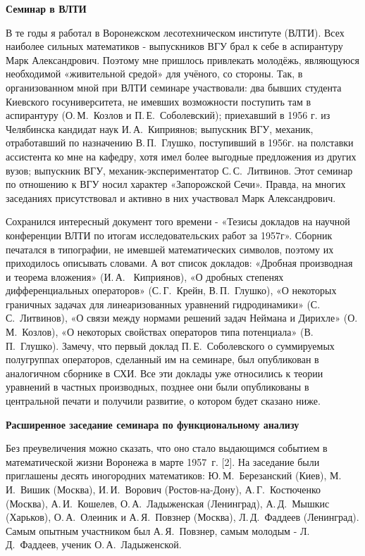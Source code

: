 {\bf Семинар в ВЛТИ}

В те годы я работал в Воронежском лесотехническом институте (ВЛТИ).
Всех наиболее сильных математиков - выпускников ВГУ брал к себе в аспирантуру Марк Александрович.
Поэтому мне пришлось привлекать молодёжь, являющуюся необходимой «живительной средой» для учёного, со стороны.
Так, в организованном мной при ВЛТИ семинаре участвовали:
два бывших студента Киевского госуниверситета, не имевших возможности поступить там в аспирантуру
(О.\,М.~Козлов и П.\,Е.~Соболевский); приехавший в 1956 г. из Челябинска кандидат наук И.\,А.~Киприянов;
выпускник ВГУ, механик, отработавший по назначению В.\,П.~Глушко, поступивший в 1956г. на полставки ассистента ко мне на кафедру,
хотя имел более выгодные предложения из других вузов; выпускник ВГУ, механик-экспериментатор С.\,С.~Литвинов. Этот семинар по отношению к ВГУ носил характер «Запорожской Сечи». Правда, на многих заседаниях присутствовал и активно в них участвовал Марк Александрович.

Сохранился интересный документ того времени - «Тезисы докладов на научной конференции ВЛТИ по итогам исследовательских работ за 1957г». Сборник печатался в типографии, не имевшей математических символов, поэтому их приходилось описывать словами. А вот список докладов: «Дробная производная и теорема вложения» (И.\,А.~ Киприянов), «О дробных степенях дифференциальных операторов» (С.\,Г.~Крейн, В.\,П.~Глушко), «О некоторых граничных задачах для линеаризованных уравнений гидродинамики» (С.\,С.~Литвинов), «О связи между нормами решений задач Неймана и Дирихле» (О.\,М.~Козлов), «О некоторых свойствах операторов типа потенциала» (В.\,П.~Глушко). Замечу, что первый доклад П.\,Е.~Соболевского о суммируемых полугруппах операторов, сделанный им на семинаре, был опубликован в аналогичном сборнике в СХИ. Все эти доклады уже относились к теории уравнений в частных производных, позднее они были опубликованы в центральной печати и получили развитие, о котором будет сказано ниже.

{\bf Расширенное заседание семинара по фу\-н\-к\-ци\-о\-на\-ль\-но\-му анализу}

Без преувеличения можно сказать, что оно стало выдающимся событием в математической жизни Воронежа в марте 1957~г. [2].
На заседание были приглашены десять иногородних математиков:
Ю.\,М.~Березанский (Киев),
М.\,И.~Ви\-шик (Москва), И.\,И.~Ворович (Ростов-на-Дону), А.\,Г.~Костюченко (Москва), А.\,И.~Кошелев,
О.\,А.~Ладыженская (Ленинград), А.\,Д.~Мышкис (Харьков), О.\,А.~Олеиник и
\linebreak
А.\,Я.~По\-в\-з\-нер (Москва),
Л.\,Д.~Фаддеев (Ленинград).
Самым опытным участником был А.\,Я.~Повзнер, самым молодым - Л.\,Д.~Фаддеев, ученик О.\,А.~Ладыженской.

